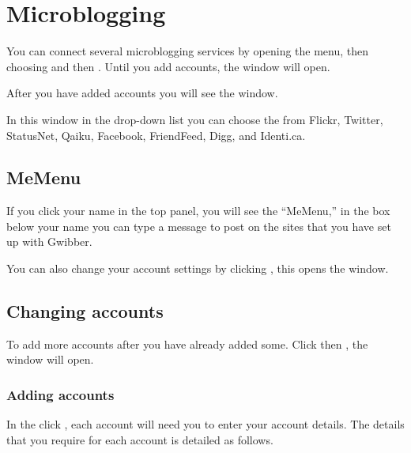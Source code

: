 
\section{Microblogging}

You can connect several microblogging services by opening the 
menu, then choosing  and then . 
Until you add accounts, the  window will open.


After you have added accounts you will see the  window.

In this window in the  drop-down list you can choose the from
Flickr, Twitter, StatusNet, Qaiku, Facebook, FriendFeed, Digg, and Identi.ca.



\subsection{MeMenu}

If you click your name in the top panel, you will see the ``MeMenu,'' in the box 
below your name you can type a message to post on the sites that you have set up
with Gwibber.

You can also change your account settings by clicking ,
 this opens the  window.


\subsection{Changing accounts}

To add more accounts after you have already added some. Click  then 
, the  window will open.

\subsubsection{Adding accounts}

In the  click , each account will need
you to enter your account details. The details that you require for each account
 is detailed as follows.

